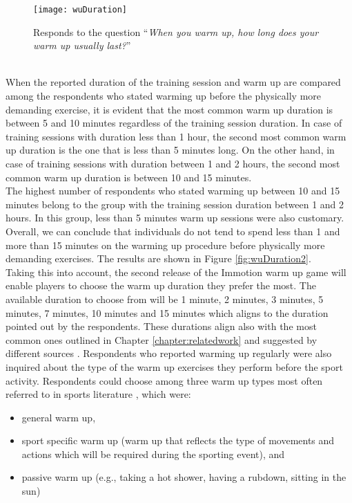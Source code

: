  \begin{figure}[h]
    \centering
    \texttt{[image: wuDuration]}
    \caption[Results related to warm up duration.]{Responds to the question ``\textit{When you warm up, how long does your warm up usually last?}''}
    \label{fig:wuDuration}
\end{figure}\\When the reported duration of the training session and warm up are compared among the respondents who stated warming up before the physically more demanding exercise, it is evident that the most common warm up duration is between 5 and 10 minutes regardless of the training session duration. In case of training sessions with duration less than 1 hour, the second most common warm up duration is the one that is less than 5 minutes long. On the other hand, in case of training sessions with duration between 1 and 2 hours, the second most common warm up duration is between 10 and 15 minutes. \\The highest number of respondents who stated warming up between 10 and 15 minutes belong to the group with the training session duration between 1 and 2 hours. In this group, less than 5 minutes warm up sessions were also customary. Overall, we can conclude that individuals do not tend to spend less than 1 and more than 15 minutes on the warming up procedure before physically more demanding exercises. The results are shown in Figure \ref{fig:wuDuration2}.\\Taking this into account, the second release of the Immotion warm up game will enable players to choose the warm up duration they prefer the most. The available duration to choose from will be 1 minute, 2 minutes, 3 minutes, 5 minutes, 7 minutes, 10 minutes and 15 minutes which aligns to the duration pointed out by the respondents. These durations align also with the most common ones outlined in Chapter \ref{chapter:relatedwork} and suggested by different sources \cite{bishop2003warm2}. Respondents who reported warming up regularly were also inquired about the type of the warm up exercises they perform before the sport activity. Respondents could choose among three warm up types most often referred to in sports literature \cite{shellock1985warming, bishop2003warm2}, which were: 
\begin{itemize}
\item general warm up,
\item sport specific warm up (warm up that reflects the type of movements and actions which will be required during the sporting event), and 
\item passive warm up (e.g., taking a hot shower, having a rubdown, sitting in the sun)
\end{itemize} 

